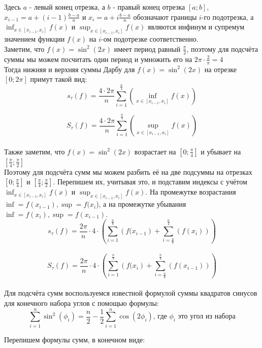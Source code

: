 \documentclass{article}
\begin{document}
Здесь $a$ - левый конец отрезка, а $b$ - правый конец отрезка $[a;b]$, 
$x_{i-1}=a+(i-1)\frac{b-a}{n}$ и $x_i=a+i\frac{b-a}{n}$ обозначают границы $i$-го подотрезка, а $\inf_{x\in[x_{i-1},x_i]} f(x)$ и $\sup_{x\in[x_{i-1},x_i]} f(x)$ являются инфинум и супремум значением функции $f(x)$ на $i$-ом подотрезке соответственно.\\

Заметим, что $f(x)=\sin^2(2x)$ имеет период равный $\frac{\pi}{2}$, поэтому для подсчёта суммы мы можем посчитать один период и умножить его на $2\pi\cdot\frac{2}{\pi} = 4$\\
Тогда нижняя и верхняя суммы Дарбу для $f(x)=\sin^2(2x)$ на отрезке $[0;2\pi]$ примут такой вид:\\

$$
s_\tau(f) = 
\frac{4\cdot2\pi}{n}\sum_{i=1}^{\frac{n}{4}}\left(\inf_{x\in[x_{i-1},x_i]} f(x)\right)
$$

$$
S_\tau(f) = 
\frac{4\cdot2\pi}{n}\sum_{i=1}^{\frac{n}{4}}\left(\sup_{x\in[x_{i-1},x_i]} f(x)\right)
$$\\
Также заметим, что $f(x)=\sin^2(2x)$ возрастает на $[0;\frac{\pi}{4}]$ и убывает на $[\frac{\pi}{4};\frac{\pi}{2}]$ \\
Поэтому для подсчёта сумм мы можем разбить её на две подсуммы на отрезках $[0;\frac{\pi}{4}]$ и $[\frac{\pi}{4};\frac{\pi}{2}]$. Перепишем их, учитывая это, и подставим индексы с учётом $\inf_{x\in[x_{i-1},x_i]} f(x)$ и $\sup_{x\in[x_{i-1},x_i]} f(x)$. На промежутке возрастания $\inf = f(x_{i-1}), \sup = f(x_i$), а на промежутке убывания $\inf = f(x_{i}), \sup = f(x_{i-1})$. \\

$$
s_\tau(f) = 
\frac{2\pi}{n}\cdot4\cdot
\left( \sum_{i=1}^{\frac{n}{8}}\left(f(x_{i-1}\right) + \sum_{i=\frac{n}{8}}^{\frac{n}{4}}\left(f(x_{i})\right)\right)
$$\\

$$
S_\tau(f) = 
\frac{2\pi}{n}\cdot4\cdot
\left( \sum_{i=1}^{\frac{n}{8}}\left(f(x_{i}\right) + \sum_{i=\frac{n}{8}}^{\frac{n}{4}}\left(f(x_{i-1})\right)\right)
$$\\

Для подсчёта сумм воспользуемся известной формулой суммы квадратов синусов для конечного набора углов с помощью формулы:
$$\sum_{i=1}^n \sin^2(\phi_i) = \frac{n}{2} - \frac{1}{2}\sum_{i=1}^n \cos(2\phi_i)\text{, где } \phi_i \text{ это угол из набора}$$

Перепишем формулы сумм, в конечном виде:\\
\end{document}
